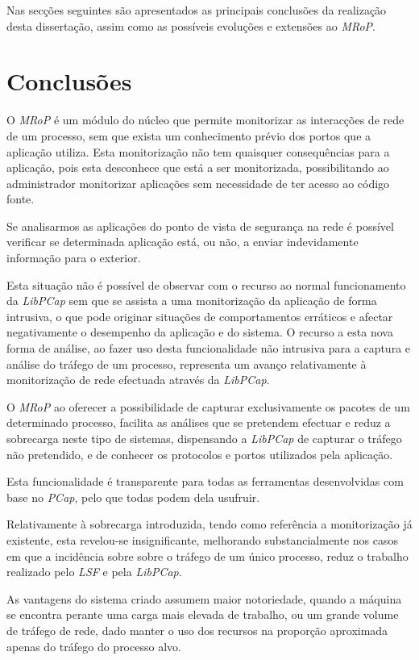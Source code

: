 Nas secções seguintes são apresentados as principais conclusões da realização desta dissertação, assim como as possíveis evoluções e extensões ao \textit{MRoP}.

\section{Conclusões}
\label{sec:conclusoes}

O \textit{MRoP} é um módulo do núcleo que permite monitorizar as interacções de rede de um processo, sem que exista um conhecimento prévio dos portos que a aplicação utiliza.
Esta monitorização não tem quaisquer consequências para a aplicação, pois esta desconhece que está a ser monitorizada, possibilitando ao administrador monitorizar aplicações sem necessidade de ter acesso ao código fonte.

Se analisarmos as aplicações do ponto de vista de segurança na rede é possível verificar se determinada aplicação está, ou não, a enviar indevidamente informação para o exterior.

Esta situação não é possível de observar com o recurso ao normal funcionamento da \textit{LibPCap} sem que se assista a uma monitorização da aplicação de forma intrusiva, o que pode originar situações de comportamentos erráticos e afectar negativamente o desempenho da aplicação e do sistema.
O recurso a esta nova forma de análise, ao fazer uso desta funcionalidade não intrusiva para a captura e análise do tráfego de um processo, representa um avanço relativamente à monitorização de rede efectuada através da \textit{LibPCap}.

O \textit{MRoP} ao oferecer a possibilidade de capturar exclusivamente os pacotes de um determinado processo, facilita as análises que se pretendem efectuar e reduz a sobrecarga neste tipo de sistemas, dispensando a \textit{LibPCap} de capturar o tráfego não pretendido, e de conhecer os protocolos e portos utilizados pela aplicação.

Esta funcionalidade é transparente para todas as ferramentas desenvolvidas com base no \textit{PCap}, pelo que todas podem dela usufruir.

Relativamente à sobrecarga introduzida, tendo como referência a monitorização já existente, esta revelou-se insignificante, melhorando substancialmente nos casos em que a incidência sobre sobre o tráfego de um único processo, reduz o trabalho realizado pelo \textit{LSF} e pela \textit{LibPCap}.

As vantagens do sistema criado assumem maior notoriedade, quando a máquina se encontra perante uma carga mais elevada de trabalho, ou um grande volume de tráfego de rede, dado manter o uso dos recursos na proporção aproximada apenas do tráfego do processo alvo.

